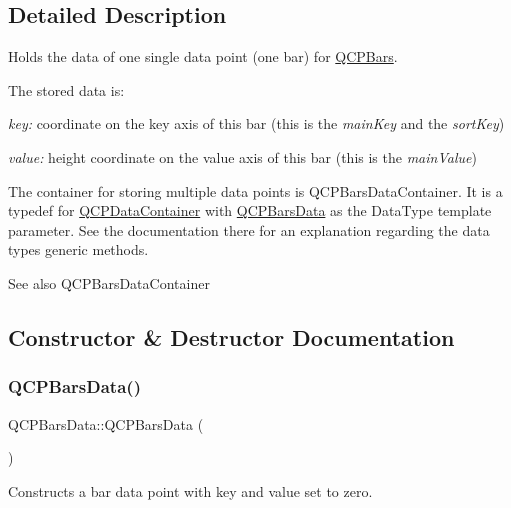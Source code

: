 \subsection{Detailed Description}
Holds the data of one single data point (one bar) for \hyperlink{classQCPBars}{Q\+C\+P\+Bars}. 

The stored data is\+: \begin{DoxyItemize}
\item {\itshape key\+:} coordinate on the key axis of this bar (this is the {\itshape main\+Key} and the {\itshape sort\+Key}) \item {\itshape value\+:} height coordinate on the value axis of this bar (this is the {\itshape main\+Value})\end{DoxyItemize}
The container for storing multiple data points is Q\+C\+P\+Bars\+Data\+Container. It is a typedef for \hyperlink{classQCPDataContainer}{Q\+C\+P\+Data\+Container} with \hyperlink{classQCPBarsData}{Q\+C\+P\+Bars\+Data} as the Data\+Type template parameter. See the documentation there for an explanation regarding the data type\textquotesingle{}s generic methods.

\begin{DoxySeeAlso}{See also}
Q\+C\+P\+Bars\+Data\+Container 
\end{DoxySeeAlso}


\subsection{Constructor \& Destructor Documentation}
\mbox{\label{classQCPBarsData_a800794d4c5fea22eeb8bade20798496b}} 
\subsubsection{\texorpdfstring{Q\+C\+P\+Bars\+Data()}{QCPBarsData()}\hspace{0.1cm}{\footnotesize\ttfamily [1/2]}}
{\footnotesize\ttfamily Q\+C\+P\+Bars\+Data\+::\+Q\+C\+P\+Bars\+Data (\begin{DoxyParamCaption}{ }\end{DoxyParamCaption})}

Constructs a bar data point with key and value set to zero. \mbox{\label{classQCPBarsData_a4158816a69e2c675885f48afa2b5acc9}} 
